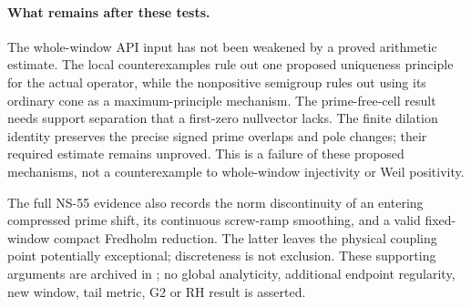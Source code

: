 \paragraph{What remains after these tests.}
The whole-window API input has not been weakened by a proved arithmetic
estimate. The local counterexamples rule out one proposed uniqueness
principle for the actual operator, while the nonpositive semigroup rules
out using its ordinary cone as a maximum-principle mechanism. The
prime-free-cell result needs support separation that a first-zero
nullvector lacks. The finite dilation identity preserves the precise
signed prime overlaps and pole changes; their required estimate remains
unproved. This is a failure of these proposed mechanisms, not a
counterexample to whole-window injectivity or Weil positivity.

The full NS-55 evidence also records the norm discontinuity of an
entering compressed prime shift, its continuous screw-ramp smoothing,
and a valid fixed-window compact Fredholm reduction. The latter leaves
the physical coupling point potentially exceptional; discreteness is
not exclusion. These supporting arguments are archived in
; no global analyticity, additional endpoint
regularity, new window, tail metric, G2 or RH result is asserted.
